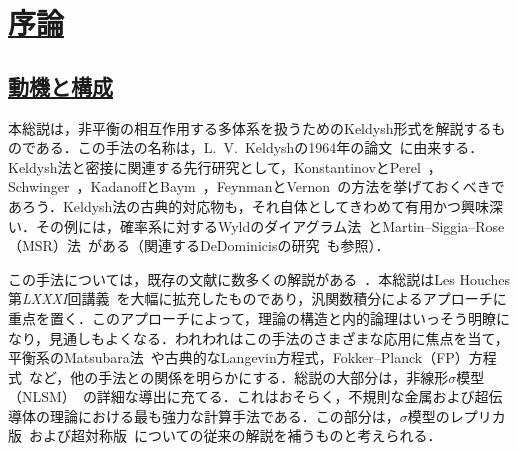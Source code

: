 \documentclass[a4paper,11pt]{ltjsarticle}
\newcommand{\sectionlink}[1]{\section[#1]{\hyperlink{toc}{#1}}}
\newcommand{\subsectionlink}[1]{\subsection[#1]{\hyperlink{toc}{#1}}}
\begin{document}
\begin{abstract}
本総説の目的は，相互作用する非平衡フェルミオン系およびボソン系に対するKeldysh法を，教育的かつ包括的に導入することである．基礎となる微視的模型の汎関数積分表示に重点を置く．総説の大部分を，乱れた金属および超伝導体に対する非線形$\sigma$模型の導出と応用に充てる．輸送特性，メゾスコピック効果，計数統計，相互作用補正，運動論方程式などを論じる．乱れた超伝導体を扱う章では，Usadel方程式，揺らぎ補正，時間依存Ginzburg--Landau理論，近接効果，Josephson効果などを取り上げる．本総説はarXiv:cond-mat/0412296を大幅に拡張したものである．
\bigskip
\noindent\textbf{キーワード：} Keldysh法；Green関数；運動論方程式；非線形$\sigma$模型；メゾスコピック系；揺らぐ超伝導体．
\end{abstract}
\hypertarget{toc}{}
\tableofcontents
\clearpage
\sectionlink{序論}\label{sec_intro}
\subsectionlink{動機と構成}\label{sec_motivation}


本総説は，非平衡の相互作用する多体系を扱うためのKeldysh形式を解説するものである．この手法の名称は，L.~V.~Keldyshの1964年の論文~\cite{Keldysh:1964ud}に由来する．Keldysh法と密接に関連する先行研究として，KonstantinovとPerel~\cite{KonstantinovPerel}，Schwinger~\cite{Schwinger:1960qe}，KadanoffとBaym~\cite{KadanoffBaym}，FeynmanとVernon~\cite{Feynman:1963fq}の方法を挙げておくべきであろう．Keldysh法の古典的対応物も，それ自体としてきわめて有用かつ興味深い．その例には，確率系に対するWyldのダイアグラム法~\cite{Wyld:1961gqg}とMartin--Siggia--Rose（MSR）法~\cite{Martin:1973zz}がある（関連するDeDominicisの研究~\cite{DeDominicis}も参照）．


この手法については，既存の文献に数多くの解説がある~\cite{Lifshitz,Rammer:1986zz,SmithJensen-book,Mahan,Rammer-book,SchwabRaimondi,Spicka}．本総説はLes Houches第\textit{LXXXI}回講義~\cite{Kamenev:2004jgp}を大幅に拡充したものであり，汎関数積分によるアプローチに重点を置く．このアプローチによって，理論の構造と内的論理はいっそう明瞭になり，見通しもよくなる．われわれはこの手法のさまざまな応用に焦点を当て，平衡系のMatsubara法~\cite{Matsubara:1955ws,AGD}や古典的なLangevin方程式，Fokker--Planck（FP）方程式~\cite{Gardiner,Risken}など，他の手法との関係を明らかにする．総説の大部分は，非線形$\sigma$模型（NLSM）~\cite{HorbachSchon,Kamenev:1999zza,Chamon:1999zz,Feigel'manLarkinSkvortsov}の詳細な導出に充てる．これはおそらく，不規則な金属および超伝導体の理論における最も強力な計算手法である．この部分は，$\sigma$模型のレプリカ版~\cite{Wegner,EfetovLarkinKhmelnitskii,Finkel'stein,Belitz:1994zz,Lerner}および超対称版~\cite{Efetov:1983xg,Efetov:1997fw,Mirlin}についての従来の解説を補うものと考えられる．
\end{document}
